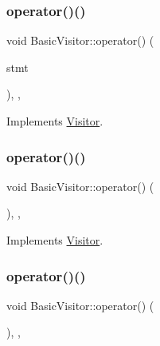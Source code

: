 \subsubsection{\texorpdfstring{operator()()}{operator()()}\hspace{0.1cm}{\footnotesize\ttfamily [28/60]}}
{\footnotesize\ttfamily void Basic\+Visitor\+::operator() (\begin{DoxyParamCaption}\item[{const \hyperlink{struct_if_statement}{If\+Statement} \&}]{stmt }\end{DoxyParamCaption})\hspace{0.3cm}{\ttfamily [inline]}, {\ttfamily [override]}, {\ttfamily [virtual]}}



Implements \hyperlink{struct_visitor_a9d30bc5ad73a274f7533df4b5a65ae41}{Visitor}.

\mbox{\label{struct_basic_visitor_a51de918d2508db22dba21233582f670e}} 
\subsubsection{\texorpdfstring{operator()()}{operator()()}\hspace{0.1cm}{\footnotesize\ttfamily [29/60]}}
{\footnotesize\ttfamily void Basic\+Visitor\+::operator() (\begin{DoxyParamCaption}\item[{const \hyperlink{struct_do_while_statement}{Do\+While\+Statement} \&}]{ }\end{DoxyParamCaption})\hspace{0.3cm}{\ttfamily [inline]}, {\ttfamily [override]}, {\ttfamily [virtual]}}



Implements \hyperlink{struct_visitor_a077a0025430c4b35d310bdfcbe1b180a}{Visitor}.

\mbox{\label{struct_basic_visitor_a0a7f4e29df8d0725070caa8560d4c4b5}} 
\subsubsection{\texorpdfstring{operator()()}{operator()()}\hspace{0.1cm}{\footnotesize\ttfamily [30/60]}}
{\footnotesize\ttfamily void Basic\+Visitor\+::operator() (\begin{DoxyParamCaption}\item[{const \hyperlink{struct_while_statement}{While\+Statement} \&}]{ }\end{DoxyParamCaption})\hspace{0.3cm}{\ttfamily [inline]}, {\ttfamily [override]}, {\ttfamily [virtual]}}



